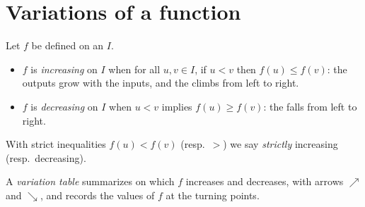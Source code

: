 \section{Variations of a function}

\begin{definition}\label{def:g10:functions:variations}
Let $f$ be defined on an  $I$.
\begin{itemize}
  \item $f$ is \emph{increasing} on $I$ when
        for all $u, v \in I$, if $u < v$ then $f(u) \leq f(v)$: the
        outputs grow with the inputs, and the  climbs from left to
        right.
  \item $f$ is \emph{decreasing} on $I$ when
        $u < v$ implies $f(u) \geq f(v)$: the  falls from left to
        right.
\end{itemize}
With strict inequalities $f(u) < f(v)$ (resp.\ $>$) we say
\emph{strictly} increasing (resp.\ decreasing).
\end{definition}

\begin{definition}\label{def:g10:functions:table}
A \emph{variation table} summarizes on which
 $f$ increases and decreases, with arrows $\nearrow$ and
$\searrow$, and records the values of $f$ at the turning points.
\end{definition}

